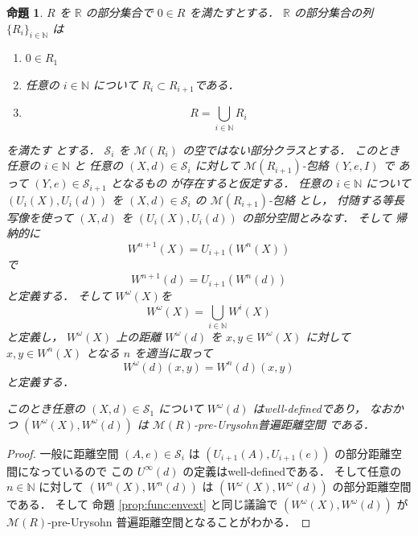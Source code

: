 \documentclass[leqno, 12pt]{jsarticle}
\newtheorem{prop}[thm]{命題}
\newcommand{\nn}{\mathbb{N}}
\newcommand{\rr}{\mathbb{R}}
\begin{document}
\begin{prop}\label{prop:func:envlimittedext}
$R$
を
$\rr$
の部分集合で
$0\in R$
を満たすとする．
$\rr$
の部分集合の列$\{R_i\}_{i\in \nn}$
は
\begin{enumerate}
\item 
$0\in R_{1}$
\item 
任意の
$i\in \nn$
について
$R_{i}\subset R_{i+1}$である．
\item 
\[
R=\bigcup_{i\in \nn}R_{i}
\]
\end{enumerate}
を満たす
とする．
$\mathscr{S}_{i}$
を
$\mathscr{M}(R_{i})$
の空ではない部分クラスとする．
このとき
任意の
$i\in \nn$
と
任意の
$(X, d)\in\mathscr{S}_{i}$
に対して
$\mathscr{M}(R_{i+1})$-包絡
$(Y, e, I)$
で
あって
$(Y, e)\in \mathscr{S}_{i+1}$
となるもの
が存在すると仮定する．
任意の
$i\in \nn$
について
$(U_{i}(X), U_{i}(d))$
を
$(X, d)\in \mathscr{S}_{i}$
の
$\mathscr{M}(R_{i+1})$-包絡
とし，
付随する等長写像を使って
$(X, d)$
を
$(U_{i}(X), U_{i}(d))$
の部分空間とみなす．
そして
帰納的に
\[
W^{n+1}(X)=U_{i+1}(W^{n}(X))
\]
で
\[
W^{n+1}(d)=U_{i+1}(W^{n}(d))
\]
と定義する．
そして
$W^{\omega}(X)$を
\[
W^{\omega}(X)=\bigcup_{i\in \nn}W^{i}(X)
\]
と定義し，
$W^{\omega}(X)$
上の距離
$W^{\omega}(d)$
を
$x, y\in W^{\omega}(X)$
に対して
$x, y\in W^{n}(X)$
となる
$n$
を適当に取って
\[
W^{\omega}(d)(x, y)=
W^{n}(d)(x, y)
\]
と定義する．




このとき任意の
$(X, d)\in \mathscr{S}_{1}$
について
$W^{\omega}(d)$
はwell-definedであり，
なおかつ
$(W^{\omega}(X), W^{\omega}(d))$
は
$\mathscr{M}(R)$-pre-Urysohn普遍距離空間
である．
\end{prop}

\begin{proof}
一般に距離空間
$(A, e)\in \mathscr{S}_{i}$
は
$(U_{i+1}(A), U_{i+1}(e))$
の部分距離空間になっているので
この
$U^{\infty}(d)$
の定義はwell-definedである．
そして任意の
$n\in \nn$
に対して
$(W^{n}(X), W^{n}(d))$
は
$(W^{\omega}(X), W^{\omega}(d))$
の部分距離空間である．
そして
命題 
\ref{prop:func:envext}
と同じ議論で
$(W^{\omega}(X), W^{\omega}(d))$
が
$\mathscr{M}(R)$-pre-Urysohn
普遍距離空間となることがわかる．
\end{proof}









\end{document}
